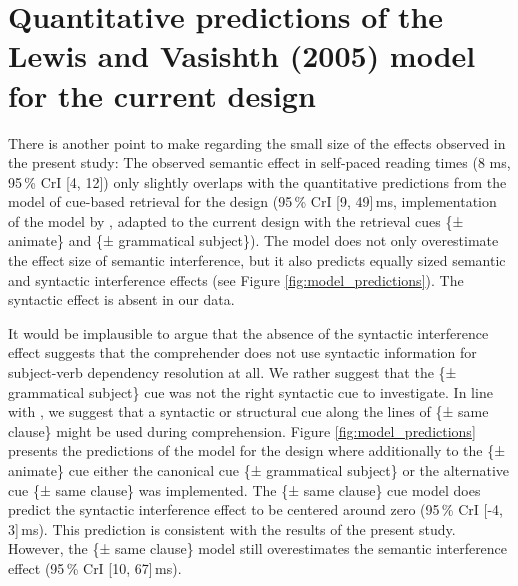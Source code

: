 \documentclass[a4paper, man, floatsintext]{apa7}
\begin{document}
\section{Quantitative predictions of the Lewis and Vasishth (2005) model for the current design}

There is another point to make regarding the small size of the effects observed in the present study: The observed semantic effect in self-paced reading times (8 ms, 95\,\% CrI [4, 12]) only slightly overlaps with the quantitative predictions from the \citet{Lewis2005} model of cue-based retrieval for the \citet{vandyke07} design (95\,\% CrI [9, 49]\,ms, implementation of the model by \cite{engelmann_etal_2019}, adapted to the current design with the retrieval cues \{± animate\} and \{± grammatical subject\}). The \citet{Lewis2005} model does not only overestimate the effect size of semantic interference, but it also predicts equally sized semantic and syntactic interference effects (see Figure \ref{fig:model_predictions}). The syntactic effect is absent in our data.

It would be implausible to argue that the absence of the syntactic interference effect suggests that the comprehender does not use syntactic information for subject-verb dependency resolution at all. We rather suggest that the \{± grammatical subject\} cue was not the right syntactic cue to investigate. In line with \citet{mertzen}, we suggest that a syntactic or structural cue along the lines of \{± same clause\} might be used during comprehension. Figure \ref{fig:model_predictions} presents the predictions of the \citet{Lewis2005} model for the \citet{vandyke07} design where additionally to the \{± animate\} cue either the canonical cue \{± grammatical subject\} or the alternative cue \{± same clause\} was implemented. The \{± same clause\} cue model does predict the syntactic interference effect to be centered around zero (95\,\% CrI [-4, 3]\,ms). This prediction is consistent with the results of the present study. However, the \{± same clause\} model still overestimates the semantic interference effect (95\,\% CrI [10, 67]\,ms).
\end{document}
